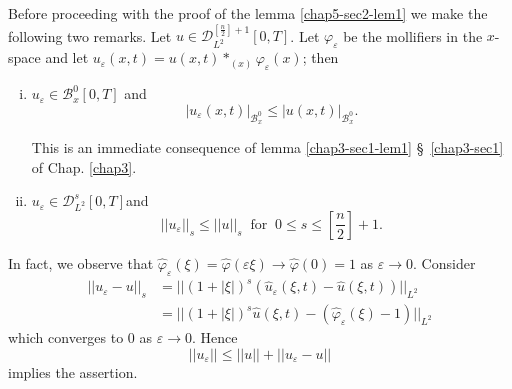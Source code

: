 Before proceeding with the proof of the lemma \ref{chap5-sec2-lem1} we
make the following two remarks. Let $u \in
\mathscr{D}^{\left[\frac{n}{2}\right]+1}_{L^2} [0, T]$. Let
$\varphi_\varepsilon$ be the mollifiers in the $x$-space 
and let $u_\varepsilon (x, t) = u(x, t) *_{(x)} \varphi_\varepsilon
(x)$; then 
\begin{enumerate}[(i)]
\item $u_\varepsilon \in \mathscr{B}^0_x [0, T]$ and
\begin{equation*}
| u_\varepsilon (x, t) |_{\mathscr{B}^0_x} \leq | u (x,
t)|_{\mathscr{B}^0_x}. \tag{2.3}\label{chap5-eq2.3}  
\end{equation*}

This is an immediate consequence of lemma  \ref{chap3-sec1-lem1} \S\
\ref{chap3-sec1} of Chap. \ref{chap3}. 

\item $u_\varepsilon \in \mathscr{D}^s_{L^2} [ 0,
  T]$\pageoriginale and 
$$
|| u_\varepsilon ||_s \leq || u ||_s ~ \text{ for }~ 0 \leq s \leq
\left[\frac{n}{2} \right]+1. 
$$
\end{enumerate}

In fact, we observe that $\hat{\varphi}_\varepsilon (\xi) =
\hat{\varphi}(\varepsilon \xi) \to \hat{\varphi}(0)= 1$ as
$\varepsilon \to 0$. Consider 
\begin{align*}
|| u_\varepsilon - u ||_s & = || (1+ | \xi |)^s (\hat{u}_\varepsilon
(\xi, t) - \hat{u} (\xi, t)) ||_{L^2} \\ 
& = || (1+ | \xi |)^s \hat{u} (\xi, t) - (\hat{\varphi}_\varepsilon
(\xi ) -1) ||_{L^2}  
\end{align*}
which converges to 0 as $\varepsilon \to 0$. Hence
$$
|| u_\varepsilon || \leq || u || + || u_\varepsilon - u ||
$$
implies the assertion.

